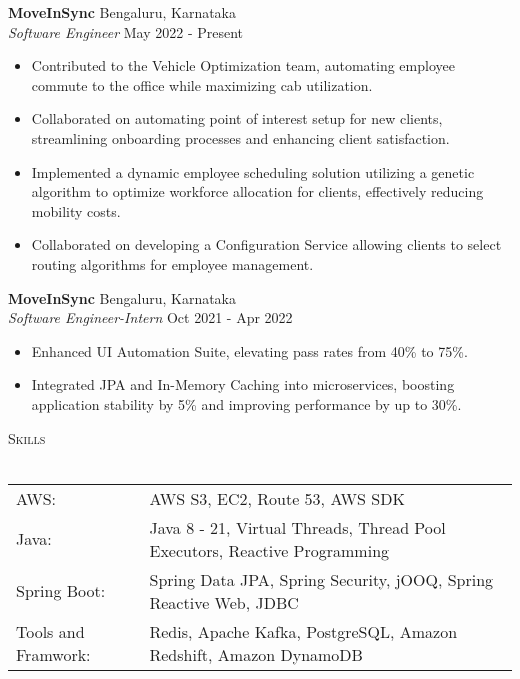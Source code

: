 \documentclass[a4paper]{article}
\newcommand{\lineunder} {
    \vspace*{-8pt} \\
    \hspace*{-18pt} \hrulefill \\
}
\newcommand{\header} [1] {
    {\hspace*{-18pt}\vspace*{6pt} \textsc{#1}}
    \vspace*{-6pt} \lineunder
}
\begin{document}
\textbf{MoveInSync} \hfill Bengaluru, Karnataka\\
\textit{Software Engineer} \hfill May 2022 - Present\\
\vspace{-1mm}
\begin{itemize} \itemsep 1pt
	\item Contributed to the Vehicle Optimization team, automating employee commute to the office while maximizing cab utilization.
	\item Collaborated on automating point of interest setup for new clients, streamlining onboarding processes and enhancing client satisfaction.
	\item Implemented a dynamic employee scheduling solution utilizing a genetic algorithm to optimize workforce allocation for clients, effectively reducing mobility costs.
	\item Collaborated on developing a Configuration Service allowing clients to select routing algorithms for employee management.
\end{itemize}
\textbf{MoveInSync} \hfill Bengaluru, Karnataka\\
\textit{Software Engineer-Intern} \hfill Oct 2021 - Apr 2022\\
\vspace{-1mm}
\begin{itemize} \itemsep 1pt
	\item Enhanced UI Automation Suite, elevating pass rates from 40\% to 75\%.
	\item Integrated JPA and In-Memory Caching into microservices, boosting application stability by 5\% and improving performance by up to 30\%.
\end{itemize}

\header{Skills}
\begin{tabular}{ l l }
	AWS:                  & AWS S3, EC2, Route 53, AWS SDK                                            \\
	Java:                 & Java 8 - 21, Virtual Threads, Thread Pool Executors, Reactive Programming \\
	Spring Boot:          & Spring Data JPA, Spring Security, jOOQ, Spring Reactive Web, JDBC         \\
    Tools and Framwork:   & Redis, Apache Kafka, PostgreSQL, Amazon Redshift, Amazon DynamoDB         \\
\end{tabular}
\vspace{2mm}
\end{document}
